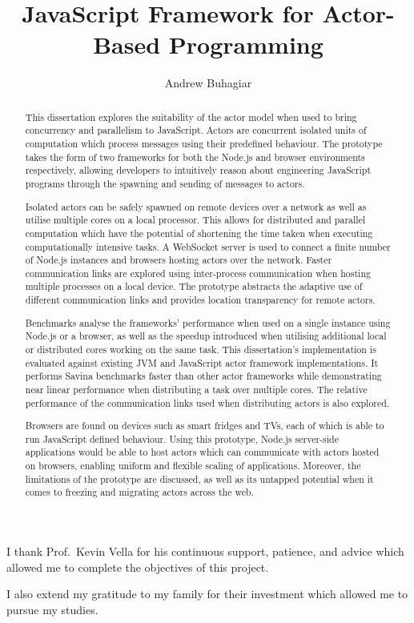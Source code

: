 \documentclass[oneside]{um-fict}
\title{JavaScript Framework for Actor-Based Programming}
\author{Andrew Buhagiar}
\begin{document}
\frontmatter 
\maketitle
\begin{acknowledgements}
I thank Prof.\ Kevin Vella for his continuous support, patience, and advice which allowed me to complete the objectives of this project.

I also extend my gratitude to my family for their investment which allowed me to pursue my studies.
\end{acknowledgements}
\begin{abstract}
\hspace{5mm}This dissertation explores the suitability of the actor model when used to bring concurrency and parallelism to JavaScript. Actors are concurrent isolated units of computation which process messages using their predefined behaviour. The prototype takes the form of two frameworks for both the Node.js and browser environments respectively, allowing developers to intuitively reason about engineering JavaScript programs through the spawning and sending of messages to actors.

\hspace{5mm}Isolated actors can be safely spawned on remote devices over a network as well as utilise multiple cores on a local processor. This allows for distributed and parallel computation which have the potential of shortening the time taken when executing computationally intensive tasks. A WebSocket server is used to connect a finite number of Node.js instances and browsers hosting actors over the network. Faster communication links are explored using inter-process communication when hosting multiple processes on a local device. The prototype abstracts the adaptive use of different communication links and provides location transparency for remote actors.

\hspace{5mm}Benchmarks analyse the frameworks' performance when used on a single instance using Node.js or a browser, as well as the speedup introduced when utilising additional local or distributed cores working on the same task. This dissertation's implementation is evaluated against existing JVM and JavaScript actor framework implementations. It performs Savina benchmarks faster than other actor frameworks while demonstrating near linear performance when distributing a task over multiple cores. The relative performance of the communication links used when distributing actors is also explored.

\hspace{5mm}Browsers are found on devices such as smart fridges and TVs, each of which is able to run JavaScript defined behaviour. Using this prototype, Node.js server-side applications would be able to host actors which can communicate with actors hosted on browsers, enabling uniform and flexible scaling of applications. Moreover, the limitations of the prototype are discussed, as well as its untapped potential when it comes to freezing and migrating actors across the web.
\end{abstract}\if@openright\cleardoublepage\else\clearpage\fi
\end{document}
